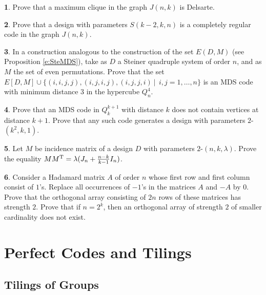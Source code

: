 \documentclass[11pt]{article}
\theoremstyle{definition}
\newtheorem{exercise}{\quad}
\begin{document}
{{{\begin{exercise}
Prove that a maximum clique in the graph $J(n,k)$ is
Delsarte.
\end{exercise}

\begin{exercise}
Prove that a design with parameters $S(k-2,k,n)$ is a completely
regular code in the graph $J(n,k)$.
\end{exercise}

\begin{exercise}
In a construction analogous to the construction of the set $E(D,M)$ (see
Proposition \ref{e:SteMDS}), take as
 $D$ a Steiner quadruple system of order $n$, and as $M$ the set
  of even permutations. Prove that the
set $E[D,M]\cup \{(i,i,j,j), (i,j,i,j), (i,j,j,i) \ |\ \
i,j=1,\dots,n\}$ is an {\rm MDS} code with minimum  distance $3$ in the
hypercube $Q^4_n$.
\end{exercise}

\begin{exercise}
Prove that an MDS code in $Q^{k+1}_k$ with distance $k$ does not contain
vertices at distance $k+1$. Prove that any such code generates
a design with parameters $2$-$(k^2,k,1)$.
\end{exercise}

\begin{exercise}
Let $M$ be incidence matrix of a design $D$ with parameters
$2$-$(n,k,\lambda)$. Prove the equality $MM^{\rm
T}=\lambda(J_n+\frac{n-k}{k-1}I_n)$.
\end{exercise}

\begin{exercise}
Consider a Hadamard matrix $A$ of order $n$ whose first row
and first column consist of $1$'s. Replace all occurrences of $-1$'s in the matrices $A$ and
$-A$ by $0$. Prove that the orthogonal array consisting of $2n$
rows of these matrices has strength $2$. Prove that if $n=2^k$, then
an orthogonal array of strength $2$ of smaller cardinality does not exist.
\end{exercise}



\section{Perfect Codes and Tilings}

\subsection{Tilings of Groups}

}}}
\end{document}
